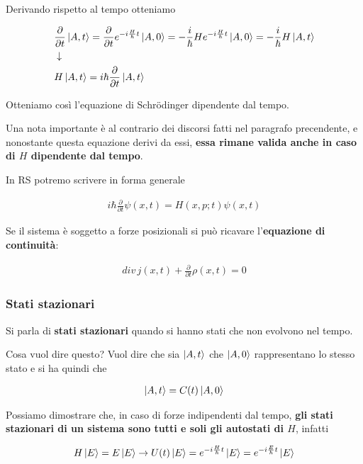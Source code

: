 Derivando rispetto al tempo otteniamo

\begin{align}
{}&\frac{\partial}{\partial t}\ket{A,t}= \frac{\partial}{\partial t}e^{-i\frac{H}{\hbar}t} \ket{A,0}=
-\frac{i}{\hbar}He^{-i\frac{H}{\hbar}t} \ket{A,0} = -\frac{i}{\hbar}H\ket{A,t}\\
&\downarrow \nonumber \\
&H\ket{A,t}= i\hbar\frac{\partial}{\partial t}\ket{A,t}
\end{align}

Otteniamo così l'equazione di Schrödinger dipendente dal tempo. 

Una nota importante è al contrario dei discorsi fatti nel paragrafo precendente, e nonostante questa equazione derivi da essi, \textbf{essa rimane valida anche in caso di $H$ dipendente dal tempo}.

In RS potremo scrivere in forma generale

\begin{align}
i\hbar \frac{\partial}{\partial t} \psi(x,t)= H(x,p;t)\psi(x,t)
\end{align}


Se il sistema è soggetto a forze posizionali si può ricavare l'\textbf{equazione di continuità}:

\begin{align}
div \, j(x,t) + \frac{\partial}{\partial t} \rho(x,t)=0
\end{align}


\subsubsection{Stati stazionari}

Si parla di \textbf{stati stazionari} quando si hanno stati che non evolvono nel tempo.

Cosa vuol dire  questo? Vuol dire che sia $\ket{A,t}$ che $\ket{A,0}$ rappresentano lo stesso stato e si ha quindi che

\begin{align}
\ket{A,t}= C(t)\ket{A,0}
\end{align}

Possiamo dimostrare che, in caso di forze indipendenti dal tempo, \textbf{gli stati stazionari di un sistema sono tutti e soli gli autostati di $H$}, infatti

\begin{align}
H\ket{E}= E\ket{E} \rightarrow U(t)\ket{E}= e^{-i\frac{H}{\hbar}t} \ket{E}=e^{-i\frac{E}{\hbar}t} \ket{E}
\end{align}

